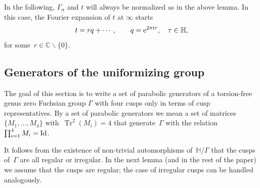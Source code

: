 \documentclass[pdftex]{sigma}
\newcommand{\C}{\mathbb{C}}
\newcommand{\Po}{\mathbb{H}}
\numberwithin{equation}{section}
\begin{document}
In the following, $\Gamma_\alpha$ and $t$ will always be normalized as in the above lemma. In this case, the Fourier expansion of $t$ at $\infty$ starts
\begin{equation}\label{eqn:expt}
t=rq+\cdots,\qquad q={\rm e}^{2\pi {\rm i}\tau},\quad \tau\in\Po,
\end{equation}
for some~$r\in\C\smallsetminus\{0\}$.

\subsection{Generators of the uniformizing group}\label{sec:unifgrp}
The goal of this section is to write a set of parabolic generators of a torsion-free genus zero Fuchsian group $\Gamma$ with four cusps only in terms of cusp representatives. By a set of parabolic generators we mean a set of matrices~$\{M_1,\dots,M_4\}$ with~$\operatorname{Tr}^2(M_i)=4$ that generate~$\Gamma$ with the relation~$\prod_{i=1}^4{M_i}={\rm Id}$.

It follows from the existence of non-trivial automorphisms of~$\Po/\Gamma$ that the cusps of~$\Gamma$ are all regular or irregular.
In the next lemma (and in the rest of the paper) we assume that the cusps are regular; the case of irregular cusps can be handled analogously.
\end{document}
